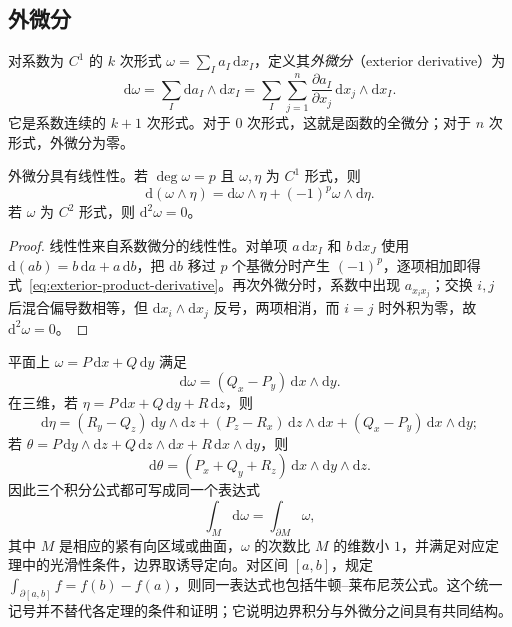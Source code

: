 \documentclass[UTF8,12pt,a4paper,fontset=fandol]{ctexbook}
\begin{document}
\subsection{外微分}
\label{subsec:exterior-derivative}

\begin{definition}
\label{def:exterior-derivative}
对系数为 $C^1$ 的 $k$ 次形式 $\omega=\sum_Ia_I\,\mathrm dx_I$，定义其\emph{外微分}（exterior derivative）为
\begin{equation}
\label{eq:exterior-derivative-definition}
    \mathrm d\omega=\sum_I\mathrm da_I\wedge\mathrm dx_I
    =\sum_I\sum_{j=1}^n\frac{\partial a_I}{\partial x_j}
      \,\mathrm dx_j\wedge\mathrm dx_I.
\end{equation}
它是系数连续的 $k+1$ 次形式。对于 $0$ 次形式，这就是函数的全微分；对于 $n$ 次形式，外微分为零。
\end{definition}

\begin{proposition}
\label{prop:exterior-derivative-rules}
外微分具有线性性。若 $\deg\omega=p$ 且 $\omega,\eta$ 为 $C^1$ 形式，则
\begin{equation}
\label{eq:exterior-product-derivative}
    \mathrm d(\omega\wedge\eta)
    =\mathrm d\omega\wedge\eta+(-1)^p\omega\wedge\mathrm d\eta.
\end{equation}
若 $\omega$ 为 $C^2$ 形式，则 $\mathrm d^2\omega=0$。
\end{proposition}
\begin{proof}
线性性来自系数微分的线性性。对单项 $a\,\mathrm dx_I$ 和 $b\,\mathrm dx_J$ 使用 $\mathrm d(ab)=b\,\mathrm da+a\,\mathrm db$，把 $\mathrm db$ 移过 $p$ 个基微分时产生 $(-1)^p$，逐项相加即得式~\eqref{eq:exterior-product-derivative}。再次外微分时，系数中出现 $a_{x_ix_j}$；交换 $i,j$ 后混合偏导数相等，但 $\mathrm dx_i\wedge\mathrm dx_j$ 反号，两项相消，而 $i=j$ 时外积为零，故 $\mathrm d^2\omega=0$。
\end{proof}

平面上 $\omega=P\,\mathrm dx+Q\,\mathrm dy$ 满足
\[
    \mathrm d\omega=(Q_x-P_y)\,\mathrm dx\wedge\mathrm dy.
\]
在三维，若 $\eta=P\,\mathrm dx+Q\,\mathrm dy+R\,\mathrm dz$，则
\[
    \mathrm d\eta=(R_y-Q_z)\,\mathrm dy\wedge\mathrm dz
      +(P_z-R_x)\,\mathrm dz\wedge\mathrm dx
      +(Q_x-P_y)\,\mathrm dx\wedge\mathrm dy;
\]
若 $\theta=P\,\mathrm dy\wedge\mathrm dz+Q\,\mathrm dz\wedge\mathrm dx+R\,\mathrm dx\wedge\mathrm dy$，则
\[
    \mathrm d\theta=(P_x+Q_y+R_z)\,\mathrm dx\wedge\mathrm dy\wedge\mathrm dz.
\]
因此三个积分公式都可写成同一个表达式
\begin{equation}
\label{eq:generalized-stokes-formula}
    \int_M\mathrm d\omega=\int_{\partial M}\omega,
\end{equation}
其中 $M$ 是相应的紧有向区域或曲面，$\omega$ 的次数比 $M$ 的维数小 $1$，并满足对应定理中的光滑性条件，边界取诱导定向。对区间 $[a,b]$，规定 $\int_{\partial[a,b]}f=f(b)-f(a)$，则同一表达式也包括牛顿--莱布尼茨公式。这个统一记号并不替代各定理的条件和证明；它说明边界积分与外微分之间具有共同结构。
\end{document}
